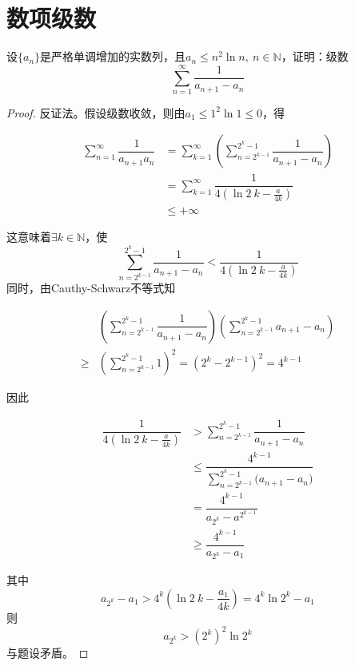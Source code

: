 \section{数项级数}

\begin{proposition}

    设$\{a_n\}$是严格单调增加的实数列，且$a_n \leq n^2 \ln n,\ n\in\mathbb{N}$，证明：级数
    $$ \sum\limits_{n=1}^{\infty}{\dfrac{1}{a_{n+1} - a_n}}$$

\end{proposition}

\begin{proof}

    反证法。假设级数收敛，则由$a_1 \leq 1^2 \ln1 \leq 0$，得
    
    \begin{align*}
        \sum\limits_{n=1}^{\infty}{\dfrac{1}{a_{n+1}a_n}} &= \sum\limits_{k=1}^{\infty}{\left(\sum\limits_{n=2^{k-1}}^{2^k - 1}{\dfrac{1}{a_{n+1}-a_n}}\right)}\\
        &= \sum\limits_{k=1}^{\infty}{\dfrac{1}{4(\ln{2}\ k-\frac{a}{4k})}}\\
        &\leq +\infty
    \end{align*}

    这意味着$\exists k \in \mathbb{N}$，使
    $$ \sum\limits_{n=2^{k-1}}^{2^k - 1}{\dfrac{1}{a_{n+1}-a_n}} < \dfrac{1}{4(\ln{2}\ k-\frac{a}{4k})}$$
    同时，由\textup{Cauthy-Schwarz}不等式知

    \begin{align*}
        & \left( \sum\limits_{n=2^{k-1}}^{2^k - 1}{\dfrac{1}{a_{n+1}-a_n}} \right) \left( \sum\limits_{n=2^{k-1}}^{2^k - 1}{a_{n+1}-a_n} \right) \\
        \geq & \left( \sum\limits_{n=2^{k-1}}^{2^k - 1}{1} \right)^2 = (2^k - 2^{k-1})^2 =  4^{k-1}
    \end{align*}

    因此

    \begin{align*}
        \dfrac{1}{4(\ln{2}\ k-\frac{a}{4k})} &> \sum\limits_{n=2^{k-1}}^{2^k - 1}{\dfrac{1}{a_{n+1}-a_n}}\\
        & \leq \dfrac{4^{k-1}}{\sum\limits_{n=2^{k-1}}^{2^k - 1}{(a_{n+1}-a_n})}\\
        & = \dfrac{4^{k-1}}{a_{2^k} - a^{2^{k-1}}}\\
        & \geq \dfrac{4^{k-1}}{a_{2^k} - a_1}
    \end{align*}

    其中
    $$a_{2^k} - a_1 > 4^k\left(\ln{2}\ k - \dfrac{a_1}{4k}\right) = 4^k \ln{2^k} - a_1$$
    则
    $$a_{2^k} > (2^k)^2 \ln{2^k}$$
    与题设矛盾。

\end{proof}

